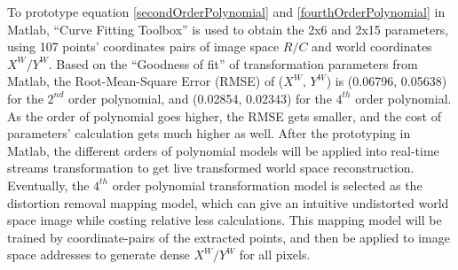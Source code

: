 %
\indent
To prototype equation \ref{secondOrderPolynomial} and \ref{fourthOrderPolynomial} in Matlab, \enquote{Curve Fitting Toolbox} is used to obtain the 2x6 and 2x15 parameters, using 107 points' coordinates pairs of image space \(R/C\) and world coordinates \(X^W/Y^W\). Based on the \enquote{Goodness of fit} of transformation parameters from Matlab, the Root-Mean-Square Error (RMSE) of (\(X^W\), \(Y^W\)) is (0.06796, 0.05638) for the \(2^{nd}\) order polynomial, and (0.02854, 0.02343) for the \(4^{th}\) order polynomial. As the order of polynomial goes higher, the RMSE gets smaller, and the cost of parameters' calculation gets much higher as well. After the prototyping in Matlab, the different orders of polynomial models will be applied into real-time streams transformation to get live transformed world space reconstruction. Eventually, the \(4^{th}\) order polynomial transformation model is selected as the distortion removal mapping model, which can give an intuitive undistorted world space image while costing relative less calculations. This mapping model will be trained by coordinate-pairs of the extracted points, and then be applied to image space addresses to generate dense \(X^W/Y^W\) for all pixels.
%
%

